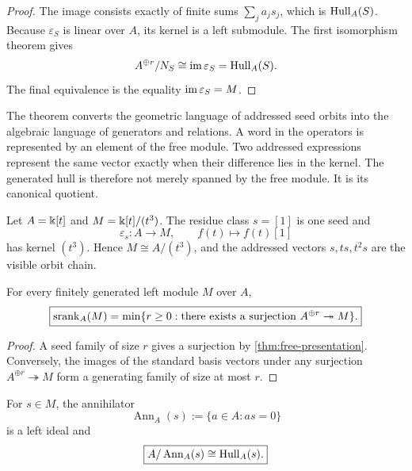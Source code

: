 \begin{proof}
The image consists exactly of finite sums $\sum_ja_js_j$, which is $\operatorname{Hull}_A(S)$.  Because $\varepsilon_S$ is linear over $A$, its kernel is a left submodule.  The first isomorphism theorem gives
\[
A^{\oplus r}/N_S\cong\operatorname{im}\varepsilon_S=\operatorname{Hull}_A(S).
\]
The final equivalence is the equality $\operatorname{im}\varepsilon_S=M$.
\end{proof}

\begin{interpretation}
The theorem converts the geometric language of addressed seed orbits into the algebraic language of generators and relations.  A word in the operators is represented by an element of the free module.  Two addressed expressions represent the same vector exactly when their difference lies in the kernel.  The generated hull is therefore not merely spanned by the free module.  It is its canonical quotient.
\end{interpretation}

\begin{microexample}[title={A cyclic nilpotent chain}]
Let \(A=\Bbbk[t]\) and \(M=\Bbbk[t]/(t^3)\).  The residue class \(s=[1]\) is one seed and
\[
\varepsilon_s:A\to M,
\qquad
f(t)\mapsto f(t)[1]
\]
has kernel \((t^3)\).  Hence \(M\cong A/(t^3)\), and the addressed vectors \(s,ts,t^2s\) are the visible orbit chain.
\end{microexample}


\begin{corollary}
\label{cor:minimal-free-cover}
For every finitely generated left module $M$ over $A$,
\[
\boxed{
\operatorname{srank}_A(M)=\min\{r\geq0:\text{there exists a surjection }A^{\oplus r}\twoheadrightarrow M\}.
}
\]
\end{corollary}

\begin{proof}
A seed family of size $r$ gives a surjection by \cref{thm:free-presentation}.  Conversely, the images of the standard basis vectors under any surjection $A^{\oplus r}\twoheadrightarrow M$ form a generating family of size at most $r$.
\end{proof}

\begin{corollary}
\label{cor:one-seed-presentation}
For $s\in M$, the annihilator
\[
\operatorname{Ann}_A(s):=\{a\in A:as=0\}
\]
is a left ideal and
\[
\boxed{A/\operatorname{Ann}_A(s)\cong\operatorname{Hull}_A(s).}
\]
\end{corollary}

